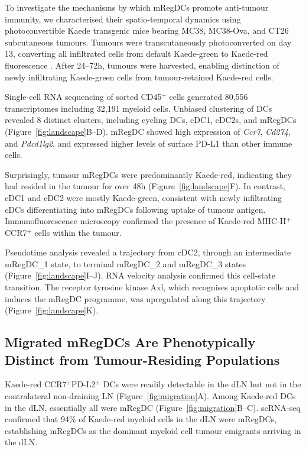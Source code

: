 \documentclass[11pt]{article}
\begin{document}
To investigate the mechanisms by which mRegDCs promote anti-tumour immunity, we characterised their spatio-temporal dynamics using photoconvertible Kaede transgenic mice bearing MC38, MC38-Ova, and CT26 subcutaneous tumours. Tumours were transcutaneously photoconverted on day 13, converting all infiltrated cells from default Kaede-green to Kaede-red fluorescence \citep{Tomura2008}. After 24--72h, tumours were harvested, enabling distinction of newly infiltrating Kaede-green cells from tumour-retained Kaede-red cells.

Single-cell RNA sequencing of sorted CD45$^+$ cells generated 80,556 transcriptomes including 32,191 myeloid cells. Unbiased clustering of DCs revealed 8 distinct clusters, including cycling DCs, cDC1, cDC2s, and mRegDCs (Figure~\ref{fig:landscape}B--D). mRegDC showed high expression of \textit{Ccr7}, \textit{Cd274}, and \textit{Pdcd1lg2}, and expressed higher levels of surface PD-L1 than other immune cells.

Surprisingly, tumour mRegDCs were predominantly Kaede-red, indicating they had resided in the tumour for over 48h (Figure~\ref{fig:landscape}F). In contrast, cDC1 and cDC2 were mostly Kaede-green, consistent with newly infiltrating cDCs differentiating into mRegDCs following uptake of tumour antigen. Immunofluorescence microscopy confirmed the presence of Kaede-red MHC-II$^+$CCR7$^+$ cells within the tumour.

Pseudotime analysis revealed a trajectory from cDC2, through an intermediate mRegDC\_1 state, to terminal mRegDC\_2 and mRegDC\_3 states (Figure~\ref{fig:landscape}I--J). RNA velocity analysis confirmed this cell-state transition. The receptor tyrosine kinase Axl, which recognises apoptotic cells and induces the mRegDC programme, was upregulated along this trajectory (Figure~\ref{fig:landscape}K).

\subsection{Migrated mRegDCs Are Phenotypically Distinct from Tumour-Residing Populations}

Kaede-red CCR7$^+$PD-L2$^+$ DCs were readily detectable in the dLN but not in the contralateral non-draining LN (Figure~\ref{fig:migration}A). Among Kaede-red DCs in the dLN, essentially all were mRegDC (Figure~\ref{fig:migration}B--C). scRNA-seq confirmed that 94\% of Kaede-red myeloid cells in the dLN were mRegDCs, establishing mRegDCs as the dominant myeloid cell tumour emigrants arriving in the dLN.
\end{document}

